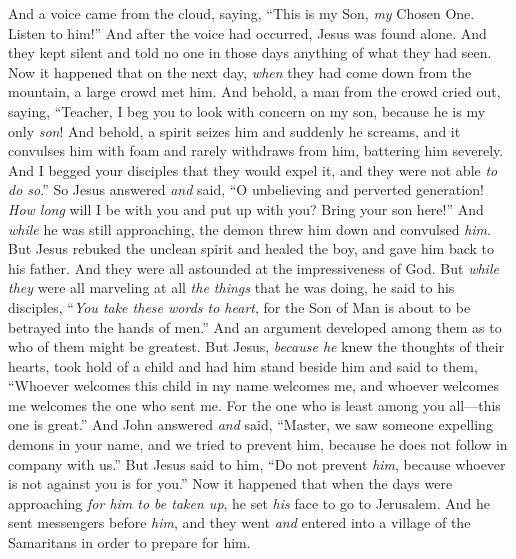 \begin{biblechapter}
\verse And a voice came from the cloud, saying, “This is my Son, \textit{my} Chosen One. Listen to him!”
\verse And after the voice had occurred, Jesus was found alone. And they kept silent and told no one in those days anything of what they had seen.
 Now it happened that on the next day, \textit{when} they had come down from the mountain, a large crowd met him.
\verse And behold, a man from the crowd cried out, saying, “Teacher, I beg you to look with concern on my son, because he is my only \textit{son}!
\verse And behold, a spirit seizes him and suddenly he screams, and it convulses him with foam and rarely withdraws from him, battering him severely.
\verse And I begged your disciples that they would expel it, and they were not able \textit{to do so}.”
\verse So Jesus answered \textit{and} said, “O unbelieving and perverted generation! \textit{How long} will I be with you and put up with you? Bring your son here!”
\verse And \textit{while} he was still approaching, the demon threw him down and convulsed \textit{him}. But Jesus rebuked the unclean spirit and healed the boy, and gave him back to his father.
\verse And they were all astounded at the impressiveness of God.
 But \textit{while they} were all marveling at all \textit{the things} that he was doing, he said to his disciples,
\verse “\textit{You take these words to heart}, for the Son of Man is about to be betrayed into the hands of men.”
 And an argument developed among them as to who of them might be greatest.
\verse But Jesus, \textit{because he} knew the thoughts of their hearts, took hold of a child and had him stand beside him
\verse and said to them, “Whoever welcomes this child in my name welcomes me, and whoever welcomes me welcomes the one who sent me. For the one who is least among you all—this one is great.”
 And John answered \textit{and} said, “Master, we saw someone expelling demons in your name, and we tried to prevent him, because he does not follow in company with us.”
\verse But Jesus said to him, “Do not prevent \textit{him}, because whoever is not against you is for you.”
 Now it happened that when the days were approaching \textit{for him to be taken up}, he set \textit{his} face to go to Jerusalem.
\verse And he sent messengers before \textit{him}, and they went \textit{and} entered into a village of the Samaritans in order to prepare for him.

\end{biblechapter}

